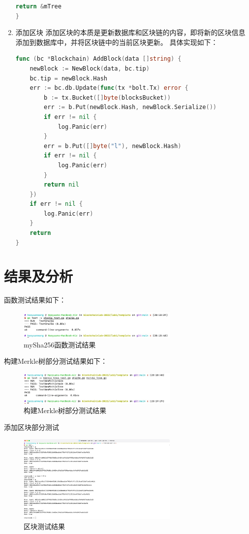 \documentclass{article}
\begin{document}
\begin{enumerate}
\begin{lstlisting}[language=go]
    return &mTree
}
    \end{lstlisting}
    \item 添加区块
    添加区块的本质是更新数据库和区块链的内容，即将新的区块信息添加到数据库中，并将区块链中的当前区块更新。
    具体实现如下：\\
    \begin{lstlisting}[language=go]
func (bc *Blockchain) AddBlock(data []string) {
    newBlock := NewBlock(data, bc.tip)
    bc.tip = newBlock.Hash
    err := bc.db.Update(func(tx *bolt.Tx) error {
        b := tx.Bucket([]byte(blocksBucket))
        err := b.Put(newBlock.Hash, newBlock.Serialize())
        if err != nil {
            log.Panic(err)
        }
        err = b.Put([]byte("l"), newBlock.Hash)
        if err != nil {
            log.Panic(err)
        }
        return nil
    })
    if err != nil {
        log.Panic(err)
    }
    return
}
    \end{lstlisting}
\end{enumerate}

\section{结果及分析}
函数测试结果如下：
\begin{figure}[H]
    \centering
    \includegraphics*[width=0.7\textwidth]{./figs/sha256_result.jpg}
    \caption{mySha256函数测试结果}
    \label{sha256 result}
\end{figure}
构建Merkle树部分测试结果如下：
\begin{figure}[H]
    \centering
    \includegraphics*[width=0.7\textwidth]{./figs/merkle_result.jpg}
    \caption{构建Merkle树部分测试结果}
    \label{merkle result}
\end{figure}
添加区块部分测试
\begin{figure}[H]
    \centering
    \includegraphics*[width=0.7\textwidth]{./figs/block_result.jpg}
    \caption{区块测试结果}
    \label{block result}
\end{figure}
\end{document}
